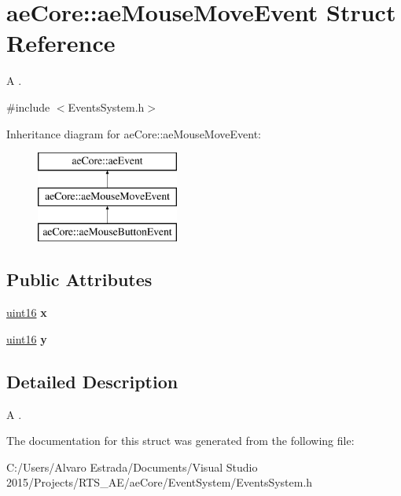 \hypertarget{structae_core_1_1ae_mouse_move_event}{}\section{ae\+Core\+:\+:ae\+Mouse\+Move\+Event Struct Reference}
\label{structae_core_1_1ae_mouse_move_event}


A .  




{\ttfamily \#include $<$Events\+System.\+h$>$}

Inheritance diagram for ae\+Core\+:\+:ae\+Mouse\+Move\+Event\+:\begin{figure}[H]
\begin{center}
\leavevmode
\includegraphics[height=3.000000cm]{structae_core_1_1ae_mouse_move_event}
\end{center}
\end{figure}
\subsection*{Public Attributes}
\begin{DoxyCompactItemize}
\item 
\hyperlink{namespaceae_core_a1f9c426e6389a4ee13ee36ad25ec447d}{uint16} {\bfseries x}\hypertarget{structae_core_1_1ae_mouse_move_event_ac3bd28b095a2cd471a868e561a50d600}{}\label{structae_core_1_1ae_mouse_move_event_ac3bd28b095a2cd471a868e561a50d600}

\item 
\hyperlink{namespaceae_core_a1f9c426e6389a4ee13ee36ad25ec447d}{uint16} {\bfseries y}\hypertarget{structae_core_1_1ae_mouse_move_event_add18c87b983245d75fb661180ff3b5ba}{}\label{structae_core_1_1ae_mouse_move_event_add18c87b983245d75fb661180ff3b5ba}

\end{DoxyCompactItemize}


\subsection{Detailed Description}
A . 

The documentation for this struct was generated from the following file\+:\begin{DoxyCompactItemize}
\item 
C\+:/\+Users/\+Alvaro Estrada/\+Documents/\+Visual Studio 2015/\+Projects/\+R\+T\+S\+\_\+\+A\+E/ae\+Core/\+Event\+System/Events\+System.\+h\end{DoxyCompactItemize}
